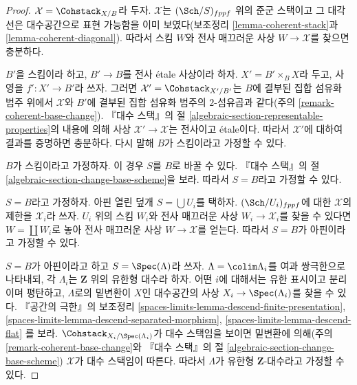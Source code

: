 \begin{proof}
$\mathcal{X} = \Cohstack_{X/B}$라 두자. $\mathcal{X}$는
$(\Sch/S)_{fppf}$ 위의 준군 스택이고 그 대각선은 대수공간으로
표현 가능함을 이미 보였다(보조정리 \ref{lemma-coherent-stack}과
\ref{lemma-coherent-diagonal}). 따라서 스킴 $W$와 전사 매끄러운 사상
$W \to \mathcal{X}$를 찾으면 충분하다.

\medskip\noindent
$B'$을 스킴이라 하고, $B' \to B$를 전사 \'etale 사상이라 하자.
$X' = B' \times_B X$라 두고, 사영을 $f' : X' \to B'$라 쓰자.
그러면 $\mathcal{X}' = \Cohstack_{X'/B'}$는 $B$에 결부된 집합 섬유화 범주
위에서 $\mathcal{X}$와 $B'$에 결부된 집합 섬유화 범주의 $2$-섬유곱과
같다(주의 \ref{remark-coherent-base-change}). 『대수 스택』의 절
\ref{algebraic-section-representable-properties}의 내용에 의해 사상
$\mathcal{X}' \to \mathcal{X}$는 전사이고 \'etale이다.
따라서 $\mathcal{X}'$에 대하여 결과를 증명하면 충분하다.
다시 말해 $B$가 스킴이라고 가정할 수 있다.

\medskip\noindent
$B$가 스킴이라고 가정하자. 이 경우 $S$를 $B$로 바꿀 수 있다.
『대수 스택』의 절 \ref{algebraic-section-change-base-scheme}을 보라.
따라서 $S = B$라고 가정할 수 있다.

\medskip\noindent
$S = B$라고 가정하자. 아핀 열린 덮개 $S = \bigcup U_i$를 택하자.
$(\Sch/U_i)_{fppf}$에 대한 $\mathcal{X}$의 제한을 $\mathcal{X}_i$라 쓰자.
$U_i$ 위의 스킴 $W_i$와 전사 매끄러운 사상
$W_i \to \mathcal{X}_i$를 찾을 수 있다면 $W = \coprod W_i$로 놓아
전사 매끄러운 사상 $W \to \mathcal{X}$를 얻는다.
따라서 $S = B$가 아핀이라고 가정할 수 있다.

\medskip\noindent
$S = B$가 아핀이라고 하고 $S = \Spec(\Lambda)$라 쓰자.
$\Lambda = \colim \Lambda_i$를 여과 쌍극한으로 나타내되, 각 $\Lambda_i$는
$\mathbf{Z}$ 위의 유한형 대수라 하자. 어떤 $i$에 대해서는 유한 표시이고
분리이며 평탄하고, $\Lambda$로의 밑변환이 $X$인 대수공간의 사상
$X_i \to \Spec(\Lambda_i)$를 찾을 수 있다. 『공간의 극한』의 보조정리
\ref{spaces-limits-lemma-descend-finite-presentation},
\ref{spaces-limits-lemma-descend-separated-morphism},
\ref{spaces-limits-lemma-descend-flat}
를 보라. $\Cohstack_{X_i/\Spec(\Lambda_i)}$가 대수 스택임을 보이면
밑변환에 의해(주의 \ref{remark-coherent-base-change}와 『대수 스택』의 절
\ref{algebraic-section-change-base-scheme}) $\mathcal{X}$가 대수 스택임이
따른다. 따라서 $\Lambda$가 유한형 $\mathbf{Z}$-대수라고 가정할 수 있다.


\end{proof}
